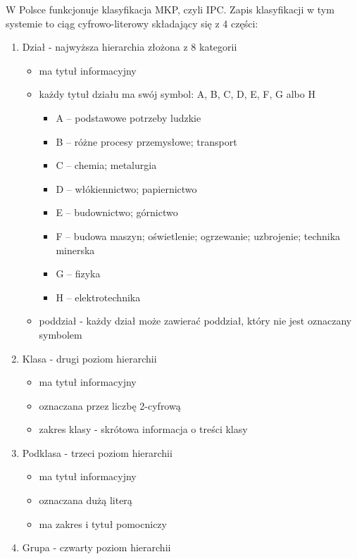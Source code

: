 W Polsce funkcjonuje klasyfikacja
\ac{MKP}, czyli \ac{IPC}. Zapis klasyfikacji w tym systemie to ciąg
cyfrowo-literowy składający się z 4 części:

\begin{enumerate}
    \item Dział - najwyższa hierarchia złożona z 8 kategorii
    \begin{itemize}
        \item ma tytuł informacyjny
        \item każdy tytuł działu ma swój symbol: A, B, C, D, E, F, G albo H
        \begin{itemize}
            \item A – podstawowe potrzeby ludzkie
            \item B – różne procesy przemysłowe; transport
            \item C – chemia; metalurgia
            \item D – włókiennictwo; papiernictwo
            \item E – budownictwo; górnictwo
            \item F – budowa maszyn; oświetlenie; ogrzewanie; uzbrojenie; technika minerska
            \item G – fizyka
            \item H – elektrotechnika
        \end{itemize}
        \item poddział - każdy dział może zawierać poddział, który nie jest oznaczany symbolem
    \end{itemize}
    \item Klasa - drugi poziom hierarchii
    \begin{itemize}
        \item ma tytuł informacyjny
        \item oznaczana przez liczbę 2-cyfrową
        \item zakres klasy - skrótowa informacja o treści klasy
    \end{itemize}
    \item Podklasa - trzeci poziom hierarchii
    \begin{itemize}
        \item ma tytuł informacyjny
        \item oznaczana dużą literą
        \item ma zakres i tytuł pomocniczy
    \end{itemize}
    \item Grupa - czwarty poziom hierarchii

\end{enumerate}
